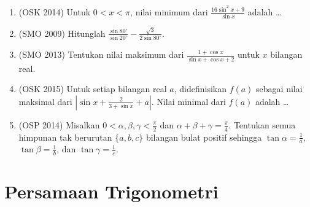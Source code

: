 \documentclass[12pt]{scrartcl}
\begin{document}
\begin{enumerate}
	\item (OSK 2014)
	Untuk $0 < x < \pi$, nilai minimum dari
	$\frac{16\sin^2 x + 9}{\sin x}$ adalah \dots

	\item (SMO 2009)
	Hitunglah $\frac{\sin 80^{\circ}}{\sin 20^{\circ}}
	- \frac{\sqrt{3}}{2\sin 80^{\circ}}$.

	\item (SMO 2013)
	Tentukan nilai maksimum dari $\frac{1+\cos x}{\sin x+\cos x+2}$
	untuk $x$ bilangan real.

	\item (OSK 2015)
	Untuk setiap bilangan real $a$, didefinisikan $f(a)$ sebagai nilai maksimal
	dari $\left|\sin x+\frac{2}{3+\sin x}+a\right|$.
	Nilai minimal dari $f(a)$ adalah \dots

	\item (OSP 2014)
	Misalkan $0 < \alpha, \beta, \gamma < \frac{\pi}{2}$ dan
	$\alpha+\beta+\gamma = \frac{\pi}{4}$. Tentukan semua himpunan tak berurutan
	$\{a, b, c\}$ bilangan bulat positif sehingga $\tan\alpha = \frac1a$,
	$\tan\beta = \frac1b$, dan $\tan\gamma = \frac1c$.

\end{enumerate}

\section{Persamaan Trigonometri}
\end{document}

